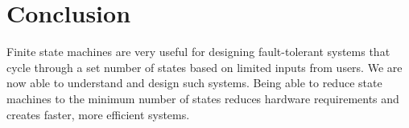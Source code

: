 \documentclass[11pt]{article}
\begin{document}
\section{Conclusion}
Finite state machines are very useful for designing fault-tolerant systems that cycle through a set number of states based on limited inputs from users. We are now able to understand and design such systems. Being able to reduce state machines to the minimum number of states reduces hardware requirements and creates faster, more efficient systems.
\end{document}
